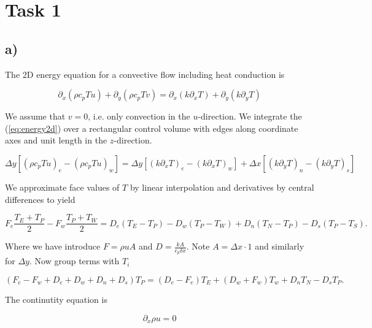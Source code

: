 \documentclass{article}
\begin{document}

\section{Task 1}

\subsection{a)}

The 2D energy equation for a convective flow including heat conduction is

\begin{equation}
\label{eq:energy2d}
\partial_x{(\rho c_p T u)} + \partial_y{(\rho c_p T v)} = \partial_x(k\partial_x T) + \partial_y(k\partial_y T)
\end{equation}

We assume that $v=0$, i.e. only convection in the $u$-direction. We integrate the (\ref{eq:energy2d}) over a rectangular control volume with edges along coordinate axes and unit length in the $z$-direction.

\begin{equation}
\Delta y \left[ (\rho c_p Tu)_e - (\rho c_p Tu)_w \right]= \Delta y \left[(k\partial_x T)_e - (k \partial_x T)_w \right] + \Delta x \left[(k\partial_y T)_n - (k \partial_y T)_s \right]
\end{equation}

We approximate face values of $T$ by linear interpolation and derivatives by central differences to yield

\begin{equation}
F_e \frac{T_E + T_P}{2} - F_w \frac{T_P + T_W}{2} = D_e(T_E-T_P) - D_w(T_P-T_W) + D_n(T_N-T_P) - D_s(T_P-T_S).
\end{equation}

Where we have introduce $ F = \rho u A$ and $ D = \frac{k A}{c_p \delta x}$. Note $A = \Delta x \cdot 1$ and similarly for $\Delta y$. Now group terms with $T_i$

\begin{equation}
(F_e - F_w + D_e + D_w + D_n + D_s) T_P = (D_e - F_e) T_E + (D_w+F_w) T_w + D_n T_N - D_s T_P.
\end{equation}

The continutity equation is 

\begin{equation}
\partial_x \rho u = 0
\end{equation}
\end{document}
